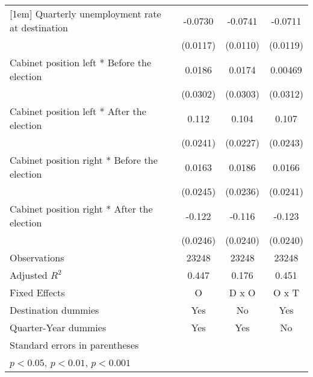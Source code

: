 \begin{table}[htbp]
\begin{tabular}{l*{3}{c}}
[1em]
Quarterly unemployment rate at destination&     -0.0730\sym{***}&     -0.0741\sym{***}&     -0.0711\sym{***}\\
                    &    (0.0117)         &    (0.0110)         &    (0.0119)         \\
[1em]
Cabinet position left * Before the election&      0.0186         &      0.0174         &     0.00469         \\
                    &    (0.0302)         &    (0.0303)         &    (0.0312)         \\
[1em]
Cabinet position left * After the election&       0.112\sym{***}&       0.104\sym{***}&       0.107\sym{***}\\
                    &    (0.0241)         &    (0.0227)         &    (0.0243)         \\
[1em]
Cabinet position right * Before the election&      0.0163         &      0.0186         &      0.0166         \\
                    &    (0.0245)         &    (0.0236)         &    (0.0241)         \\
[1em]
Cabinet position right * After the election&      -0.122\sym{***}&      -0.116\sym{***}&      -0.123\sym{***}\\
                    &    (0.0246)         &    (0.0240)         &    (0.0240)         \\
\hline
Observations        &       23248         &       23248         &       23248         \\
Adjusted \(R^{2}\)  &       0.447         &       0.176         &       0.451         \\
Fixed Effects       &           O         &       D x O         &       O x T         \\
Destination dummies &         Yes         &          No         &         Yes         \\
Quarter-Year dummies&         Yes         &         Yes         &          No         \\
\hline\hline
\multicolumn{4}{l}{\footnotesize Standard errors in parentheses}\\
\multicolumn{4}{l}{\footnotesize \sym{*} \(p<0.05\), \sym{**} \(p<0.01\), \sym{***} \(p<0.001\)}\\
\end{tabular}
\end{table}

